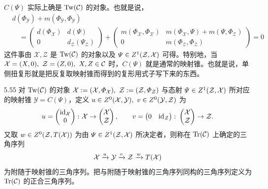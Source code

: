 $C(\varPsi)$ 实际上确是 $\mathrm{Tw}(\mathcal{C})$ 的对象。也就是说，
\[
\begin{aligned}
  & d(\varPhi_{\mathcal{Y}}) + m(\varPhi_{\mathcal{Y}},\varPhi_{\mathcal{Y}})\\
  &\quad =
  \begin{pmatrix}
    d(\varPhi_{\mathcal{X}}) & d(\varPsi)\\
    0 & d_{\mathcal{Z}}(\varPsi_{\mathcal{Z}})
  \end{pmatrix}
  +
  \begin{pmatrix}
    m(\varPhi_{\mathcal{X}},\varPhi_{\mathcal{X}}) & m(\varPhi_{\mathcal{X}},\varPsi) + m(\varPsi,\varPhi_{\mathcal{Z}})\\
    0 & m(\varPhi_{\mathcal{Z}},\varPhi_{\mathcal{Z}})
  \end{pmatrix}
  = 0
\end{aligned}
\]
这件事由 $\mathcal{X}, \mathcal{Z}$ 是 $\mathrm{Tw}(\mathcal{C})$ 的对象以及 $\varPsi \in Z^{1}(\mathcal{Z},\mathcal{X})$ 可得。特别地，当 $\mathcal{X} = (X,0),\ \mathcal{Z} = (Z,0),\ X,Z \in \cC$ 时，$C(\varPsi)$ 就是通常的映射锥。也就是说，单侧扭复形就是把反复取映射锥而得到的复形用式子写下来的东西。


\begin{definition}{5.55} 对 $\mathrm{Tw}(\mathcal{C})$ 的对象 $\mathcal{X} := (\mathcal{X},\varPhi_{\mathcal{X}}),\ \mathcal{Z} := (\mathcal{Z},\varPhi_{\mathcal{Z}})$ 与态射 $\varPsi \in Z^{1}(\mathcal{Z},\mathcal{X})$ 所对应的映射锥 $\mathcal{Y} = C(\varPsi)$，定义 $u \in Z^{0}(\mathcal{X},\mathcal{Y}),\ v \in Z^{0}(\mathcal{Y},\mathcal{Z})$ 为
\[
  u = \begin{pmatrix}\mathrm{id}_{\mathcal{X}}\\ 0\end{pmatrix}\colon \mathcal{X} \to \begin{pmatrix}\mathcal{X}\\ \mathcal{Z}\end{pmatrix},
  \qquad
  v = \begin{pmatrix}0 & \mathrm{id}_{\mathcal{Z}}\end{pmatrix}\colon \begin{pmatrix}\mathcal{X}\\ \mathcal{Z}\end{pmatrix} \to \mathcal{Z}.
\]
又取 $w \in Z^{0}(\mathcal{Z}, T(\mathcal{X}))$ 为由 $\varPsi \in Z^{1}(\mathcal{Z},\mathcal{X})$ 所决定者，则称在 $\operatorname{Tr}(\mathcal{C})$ 上确定的三角序列
\[
  \mathcal{X} \xrightarrow{u} \mathcal{Y} \xrightarrow{v} \mathcal{Z} \xrightarrow{w} T(\mathcal{X})
\]
为附随于映射锥的三角序列。把与附随于映射锥的三角序列同构的三角序列定义为 $\operatorname{Tr}(\mathcal{C})$ 的正合三角序列。\end{definition}

